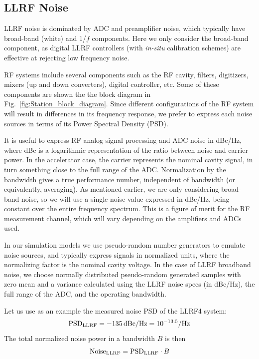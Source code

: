 \documentclass[a4paper,12pt]{article}
\begin{document}
\subsection{LLRF Noise}

LLRF noise is dominated by ADC and preamplifier noise, which typically have broad-band (white) and 1/$f$ components. Here we only consider the broad-band component, as digital LLRF controllers (with {\it in-situ} calibration schemes) are effective at rejecting low frequency noise.

RF systems include several components such as the RF cavity, filters, digitizers, mixers (up and down converters), digital controller, etc. Some of these components are shown the the block diagram in Fig.~\ref{fig:Station_block_diagram}. Since different configurations of the RF system will result in differences in its frequency response, we prefer to express each noise sources in terms of its Power Spectral Density (PSD).

It is useful to express RF analog signal processing and ADC noise in dBc/Hz, where dBc is a logarithmic representation of the ratio between noise and carrier power. In the accelerator case, the carrier represents the nominal cavity signal, in turn something close to the full range of the \hbox{ADC}.  Normalization by the bandwidth gives a true performance number, independent of bandwidth (or equivalently, averaging). As mentioned earlier, we are only considering broad-band noise, so we will use a single noise value expressed in dBc/Hz, being constant over the entire frequency spectrum. This is a figure of merit for the RF measurement channel, which will vary depending on the amplifiers and ADCs used.

In our simulation models we use pseudo-random number generators to emulate noise sources, and typically express signals in normalized units, where the normalizing factor is the nominal cavity voltage. In the case of LLRF broadband noise, we choose normally distributed pseudo-random generated samples with zero mean and a variance calculated using the LLRF noise specs (in dBc/Hz), the full range of the ADC, and the operating bandwidth.

Let us use as an example the measured noise PSD of the LLRF4 system:
\begin{equation}
  \centering {\rm PSD}_{\rm LLRF} = -135\thinspace{\rm dBc/Hz} = 10^{-13.5} {\rm /Hz}
\end{equation}
The total normalized noise power in a bandwidth $B$ is then
\begin{equation}
  \centering {\rm Noise}_{\rm LLRF} ={\rm PSD}_{\rm LLRF}\cdot B
  \label{eq:PSD_to_noise}
\end{equation}
\end{document}
